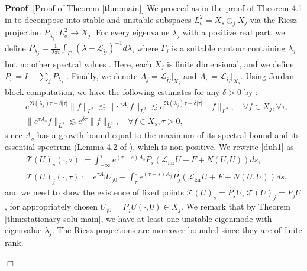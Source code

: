 \documentclass[11pt,a4paper]{article}
\numberwithin{equation}{section}
\newcommand{\assign}{:=}
\newcommand{\tmop}[1]{\ensuremath{\operatorname{#1}}}
\newenvironment{proof}{\noindent\textbf{Proof\ }}{\hspace*{\fill}$\Box$\medskip}
\begin{document}
\begin{proof}[Proof of Theorem \ref{thm:main}]
We proceed as in the proof of Theorem 4.1 in \cite{jia2015incompressible} to decompose into stable and unstable subspaces $L^2_\sigma=X_s\oplus_jX_j  $ via the Riesz projection $P_{\lambda_j}:L^2_\sigma\to X_j$. For every eigenvalue $\lambda_j$ with a positive real part, we define $P_{\lambda_j}=\frac{1}{2\pi i}\int_{\Gamma_j} (\lambda-\mathcal{L}_{\widetilde{U}})^{-1}d\lambda$, where $\Gamma_j$ is a suitable contour containing ${\lambda_j}$ but no other spectral values%
. Here, each  $X_j$ is finite dimensional, and we define $P_s=I-\sum_jP_{\lambda_j}$%
. Finally, we denote $A_j=\mathcal{L}_{\widetilde{U}}|_{X_j}$ and $A_s=\mathcal{L}_{\widetilde{U}}|_{X_s}$.  Using Jordan block computation, we have the following estimates for any $\delta>0$ by
\cite{engel2000one}:\begin{equation}
     \begin{aligned}
         &e^{\Re(\lambda_j)\tau-\delta|\tau|}\|f\|_{L^2}\lesssim \|e^{\tau A_j}f\|_{L^2} \lesssim e^{\Re(\lambda_j)\tau+\delta|\tau|}\|f\|_{L^2},\quad \forall f\in X_j, \forall\tau,\\&\|e^{ \tau A_s}f\|_{L^2} \lesssim e^{\delta\tau}\|f\|_{L^2},\quad \forall f\in X_s, \tau>0,
     \end{aligned}\label{bounds}
 \end{equation} 
 since $A_s$ has a growth bound equal to the maximum of its spectral bound and its essential spectrum (Lemma 4.2 of \cite{albritton2022non}), which is non-positive. We rewrite \eqref{duh1} as\begin{equation}
     \begin{aligned}
         &\mathcal{T}(U)_s(\cdot,\tau)\assign\int_{-\infty}^\tau e^{(\tau-s)A_s}P_s(\mathcal{L}_{\tmop{far}}U+F+N(U,U))ds,\\&\mathcal{T}(U)_j(\cdot,\tau)\assign e^{\tau A_j}U_{j0}-\int_{\tau}^0 e^{(\tau-s)A_j}P_j(\mathcal{L}_{\tmop{far}}U+F+N(U,U))ds,
     \end{aligned}\label{duh}
 \end{equation} and we need to show the existence of fixed points $\mathcal{T}(U)_s=P_sU$, $\mathcal{T}(U)_j=P_jU$, for appropriately chosen $U_{j0}=P_jU(\cdot,
 0)\in X_j$. We remark that by Theorem \ref{thm:stationary solu main}, we have at least one unstable eigenmode with eigenvalue $\lambda_j$. {The Riesz projections are moreover bounded since they are of finite rank.}

\end{proof}
\end{document}
